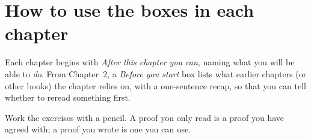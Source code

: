 \section*{How to use the boxes in each chapter}

Each chapter begins with \emph{After this chapter you can}, naming what you will
be able to \emph{do}. From Chapter~2, a \emph{Before you start} box lists what
earlier chapters (or other books) the chapter relies on, with a one-sentence
recap, so that you can tell whether to reread something first.

Work the exercises with a pencil. A proof you only read is a proof you have
agreed with; a proof you wrote is one you can use.
